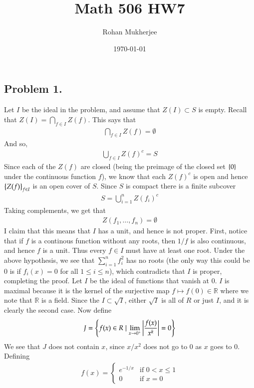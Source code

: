 \documentclass[12pt]{article}
\title{Math 506 HW7}
\date{\today}
\author{Rohan Mukherjee}
\theoremstyle{definitionstyle}
\def\mbb#1{\mathbb{#1}}
\def\R{\mbb{R}}
\newcommand{\SET}[1]{\Set{\mskip-\medmuskip #1 \mskip-\medmuskip}}
\begin{document}
    \maketitle
    \subsection*{Problem 1.}
    Let $I$ be the ideal in the problem, and assume that $Z(I) \subset S$ is empty. Recall that $Z(I) = \bigcap_{f \in I} Z(f)$. This says that
    \begin{align*}
        \bigcap_{f \in I} Z(f) = \emptyset
    \end{align*}
    And so,
    \begin{align*}
        \bigcup_{f \in I} Z(f)^c = S
    \end{align*}
    Since each of the $Z(f)$ are closed (being the preimage of the closed set $\SET{0}$ under the continuous function $f$), we know that each $Z(f)^c$ is open and hence $\SET{Z(f)}_{f \in I}$ is an open cover of $S$. Since $S$ is compact there is a finite subcover 
    \begin{align*}
        S = \bigcup_{i=1}^n Z(f_i)^c
    \end{align*}
    Taking complements, we get that
    \begin{align*}
        Z(f_1, \ldots, f_n) = \emptyset
    \end{align*}
    I claim that this means that $I$ has a unit, and hence is not proper. First, notice that if $f$ is a continous function without any roots, then $1/f$ is also continuous, and hence $f$ is a unit. Thus every $f \in I$ must have at least one root. Under the above hypothesis, we see that $\sum_{i=1}^n f_i^2$ has no roots (the only way this could be 0 is if $f_i(x) = 0$ for all $1 \leq i \leq n$), which contradicts that $I$ is proper, completing the proof. Let $I$ be the ideal of functions that vanish at 0. $I$ is maximal because it is the kernel of the surjective map $f \mapsto f(0) \in \R$ where we note that $\R$ is a field. Since the $I \subset \sqrt{I}$, either $\sqrt{I}$ is all of $R$ or just $I$, and it is clearly the second case. Now define
    \begin{align*}
        J = \SET{f(x) \in R \mid \lim_{x \to 0^+} \qty|\frac{f(x)}{x^k}| = 0}
    \end{align*}
    We see that $J$ does not contain $x$, since $x/x^2$ does not go to 0 as $x$ goes to 0. Defining
    \begin{align*}
        f(x) = \begin{cases}
            e^{-1/x} &\text{if $0 < x \leq 1$} \\
            0 &\text{if $x = 0$}
        \end{cases}
    \end{align*}
\end{document}
